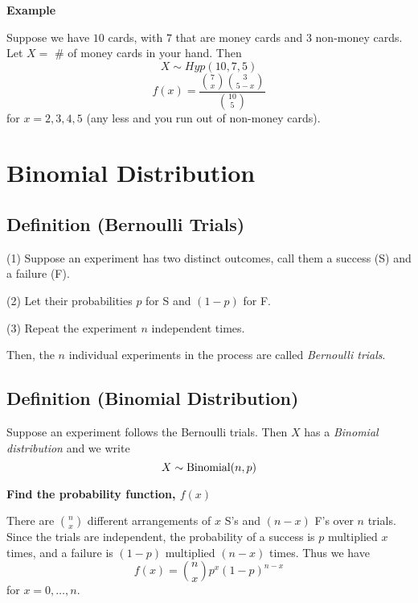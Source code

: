 \textbf{Example}

Suppose we have $ 10 $ cards, with $ 7 $ that are money cards and $ 3 $
non-money cards. Let $ X= $ \# of money cards in your hand. Then
\[ X \sim Hyp(10,7,5) \]
\[ f(x)=\frac{\binom{7}{x}\binom{3}{5-x}}{\binom{10}{5}} \]
for $ x=2,3,4,5 $ (any less and you run out of non-money cards).

\section{Binomial Distribution}
\begin{defbox}
    \subsection{Definition (Bernoulli Trials)}
    (1) Suppose an experiment has two distinct outcomes, call them a success (S)
    and a failure (F).

    (2) Let their probabilities $ p $ for S and $ (1-p) $ for F.

    (3) Repeat the experiment $ n $ independent times.

    Then, the $ n $ individual experiments in the process are called
    \emph{Bernoulli trials}.
\end{defbox}
\begin{defbox}
    \subsection{Definition (Binomial Distribution)}
    Suppose an experiment follows the Bernoulli trials. Then $ X $ has a
    \emph{Binomial distribution} and we write
    \[ X \sim \operatorname{Binomial}(n,p) \]
\end{defbox}

\textbf{Find the probability function, $ f(x)$}

There are $ \binom{n}{x} $ different arrangements of $ x $ S's and $ (n-x) $ F's
over $ n $ trials. Since the trials are independent, the probability of a success
is $ p $ multiplied $ x $ times, and a failure is $ (1-p) $ multiplied $ (n-x) $ times.
Thus we have
\[ f(x)=\binom{n}{x}p^x(1-p)^{n-x} \]
for $ x=0,\ldots ,n $.
